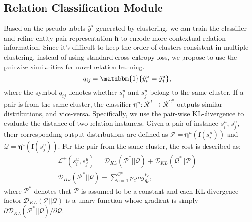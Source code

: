 \documentclass[11pt]{article}
\begin{document}
        \subsection{Relation Classification Module}
        Based on the pseudo labels $\hat{y}^u$ generated by clustering, we can train the classifier and refine entity pair representation $\bm{h}$ to encode more contextual relation information. Since it’s difficult to keep the order of clusters consistent in multiple clustering, instead of using standard cross entropy loss, we propose to use the pairwise similarities for novel relation learning. 
            \begin{equation}
                q_{ij}=\mathbbm{1}\{\hat{y}_i^u=\hat{y}_j^u\},
            \end{equation}
        where the symbol $q_{ij}$ denotes whether $s_i^u$ and $s_j^u$ belong to the same cluster. If a pair is from the same cluster, the classifier $\bm{\eta}^u:\mathcal{R}^d\rightarrow\mathcal{R}^{C^u}$ outputs similar distributions, and vice-versa. Specifically, we use the pair-wise KL-divergence to evaluate the distance of two relation instances. Given a pair of instance $s_i^u$, $s_j^u$, their corresponding output distributions are defined as $\mathcal{P}=\bm{\eta}^u(\bm{f}(s_i^u))$ and $\mathcal{Q}=\bm{\eta}^u(\bm{f}(s_j^u))$. For the pair from the same cluster, the cost is described as:
            \begin{gather}
                \mathcal{L}^+(s_i^u,s_j^u)=\mathcal{D}_{KL}(\mathcal{P^*}||\mathcal{Q})+\mathcal{D}_{KL}(\mathcal{Q^*}||\mathcal{P})\\
                \mathcal{D}_{KL}(\mathcal{P^*}||\mathcal{Q})=\sum_{c=1}^{C^u}p_clog\frac{p_c}{q_c},
            \end{gather}
        where $\mathcal{P}^*$ denotes that $\mathcal{P}$ is assumed to be a constant and each KL-divergence factor $\mathcal{D}_{KL}(\mathcal{P}||\mathcal{Q})$ is a unary function whose gradient is simply $\partial\mathcal{D}_{KL}(\mathcal{P}^*||\mathcal{Q})/\partial\mathcal{Q}$. 
        
\end{document}
